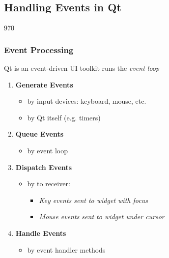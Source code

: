 \subsection{Handling Events in Qt}

\begin{slide}{970}
\frametitle{Event Processing}
\label{events_introduction}

\begin{block}{Qt is an event-driven UI toolkit}
 runs the \textit{event loop}
\end{block}
\begin{enumerate}
\item \textbf{Generate Events}
  \begin{itemize}
  \item by input devices: keyboard, mouse, etc.
  \item by Qt itself (e.g. timers)
  \end{itemize}
\item \textbf{Queue Events}
  \begin{itemize}
  \item by event loop
  \end{itemize}
\item \textbf{Dispatch Events}
  \begin{itemize}
  \item by  to receiver: 
    \begin{itemize}
    \item \textit{Key events sent to widget with focus}
    \item \textit{Mouse events sent to widget under cursor}
    \end{itemize}
 \end{itemize}
\item \textbf{Handle Events}
  \begin{itemize}
  \item by  event handler methods
  \end{itemize}
\end{enumerate}
\end{slide}

